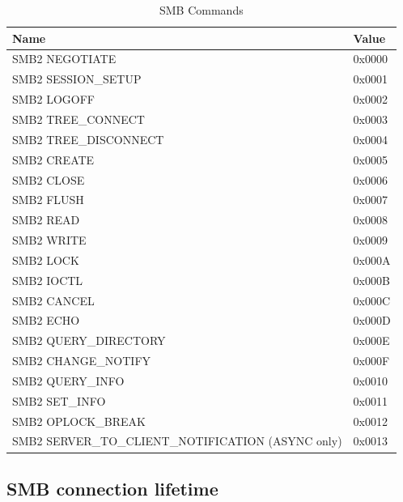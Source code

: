 \documentclass[english, 12pt, a4paper, elec, utf8, a-2b, online]{aaltothesis}
\begin{document}
\begin{table}[h]
\centering
\caption{SMB Commands}
\label{tab:smb_commands}
\begin{tabular}{|l|l|}
\hline
\textbf{Name} & \textbf{Value}\\ \hline
SMB2 NEGOTIATE & 0x0000 \\ \hline
SMB2 SESSION\_SETUP & 0x0001 \\ \hline
SMB2 LOGOFF & 0x0002 \\ \hline
SMB2 TREE\_CONNECT & 0x0003 \\ \hline
SMB2 TREE\_DISCONNECT & 0x0004 \\ \hline
SMB2 CREATE & 0x0005 \\ \hline
SMB2 CLOSE & 0x0006 \\ \hline
SMB2 FLUSH & 0x0007 \\ \hline
SMB2 READ & 0x0008 \\ \hline
SMB2 WRITE & 0x0009 \\ \hline
SMB2 LOCK & 0x000A \\ \hline
SMB2 IOCTL & 0x000B \\ \hline
SMB2 CANCEL & 0x000C \\ \hline
SMB2 ECHO & 0x000D \\ \hline
SMB2 QUERY\_DIRECTORY & 0x000E \\ \hline
SMB2 CHANGE\_NOTIFY & 0x000F \\ \hline
SMB2 QUERY\_INFO & 0x0010 \\ \hline
SMB2 SET\_INFO & 0x0011 \\ \hline
SMB2 OPLOCK\_BREAK & 0x0012 \\ \hline
SMB2 SERVER\_TO\_CLIENT\_NOTIFICATION (ASYNC only) & 0x0013 \\ \hline
\end{tabular}
\end{table}

\subsection{SMB connection lifetime}
\end{document}

